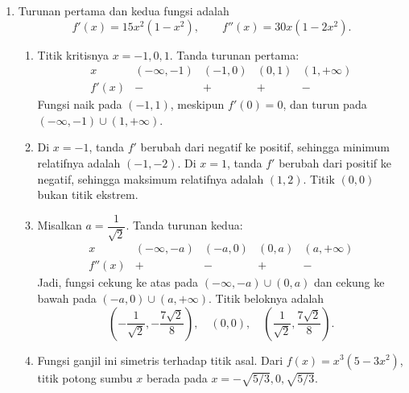 \documentclass[11pt,a4paper]{article}
\begin{document}
\begin{enumerate}
    \item Turunan pertama dan kedua fungsi adalah
    \[
        f'(x)=15x^2(1-x^2),\qquad f''(x)=30x(1-2x^2).
    \]
    \begin{enumerate}
        \item Titik kritisnya $x=-1,0,1$. Tanda turunan pertama:
        \[
            \begin{array}{c|cccc}
                x&(-\infty,-1)&(-1,0)&(0,1)&(1,+\infty)\\ \hline
                f'(x)&-&+&+&-
            \end{array}
        \]
        Fungsi naik pada $(-1,1)$, meskipun $f'(0)=0$, dan turun pada $(-\infty,-1)\cup(1,+\infty)$.
        \item Di $x=-1$, tanda $f'$ berubah dari negatif ke positif, sehingga minimum relatifnya adalah $\boxed{(-1,-2)}$. Di $x=1$, tanda $f'$ berubah dari positif ke negatif, sehingga maksimum relatifnya adalah $\boxed{(1,2)}$. Titik $(0,0)$ bukan titik ekstrem.
        \item Misalkan $a=\dfrac1{\sqrt2}$. Tanda turunan kedua:
        \[
            \begin{array}{c|cccc}
                x&(-\infty,-a)&(-a,0)&(0,a)&(a,+\infty)\\ \hline
                f''(x)&+&-&+&-
            \end{array}
        \]
        Jadi, fungsi cekung ke atas pada $(-\infty,-a)\cup(0,a)$ dan cekung ke bawah pada $(-a,0)\cup(a,+\infty)$. Titik beloknya adalah
        \[
            \boxed{\left(-\frac1{\sqrt2},-\frac{7\sqrt2}{8}\right),
            \quad(0,0),\quad
            \left(\frac1{\sqrt2},\frac{7\sqrt2}{8}\right)}.
        \]
        \item Fungsi ganjil ini simetris terhadap titik asal. Dari $f(x)=x^3(5-3x^2)$, titik potong sumbu $x$ berada pada $x=-\sqrt{5/3},0,\sqrt{5/3}$.
        \begin{center}
        \end{center}
    \end{enumerate}


\end{enumerate}
\end{document}
